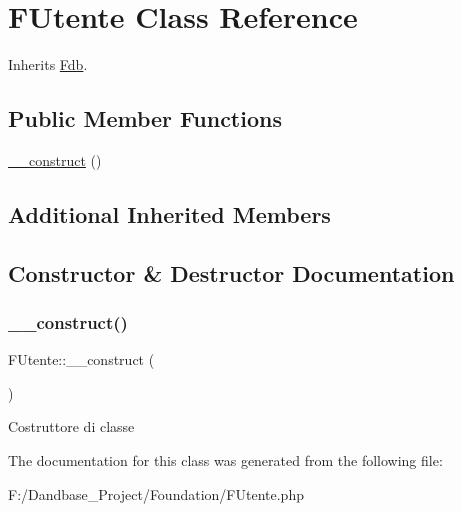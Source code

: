 \hypertarget{class_f_utente}{}\section{F\+Utente Class Reference}
\label{class_f_utente}


Inherits \mbox{\hyperlink{class_fdb}{Fdb}}.

\subsection*{Public Member Functions}
\begin{DoxyCompactItemize}
\item 
\mbox{\hyperlink{class_f_utente_ae3bd9432a83c92db7086f3d3a640cd57}{\+\_\+\+\_\+construct}} ()
\end{DoxyCompactItemize}
\subsection*{Additional Inherited Members}


\subsection{Constructor \& Destructor Documentation}
\mbox{\label{class_f_utente_ae3bd9432a83c92db7086f3d3a640cd57}} 
\subsubsection{\texorpdfstring{\+\_\+\+\_\+construct()}{\_\_construct()}}
{\footnotesize\ttfamily F\+Utente\+::\+\_\+\+\_\+construct (\begin{DoxyParamCaption}{ }\end{DoxyParamCaption})}

Costruttore di classe 

The documentation for this class was generated from the following file\+:\begin{DoxyCompactItemize}
\item 
F\+:/\+Dandbase\+\_\+\+Project/\+Foundation/F\+Utente.\+php\end{DoxyCompactItemize}
